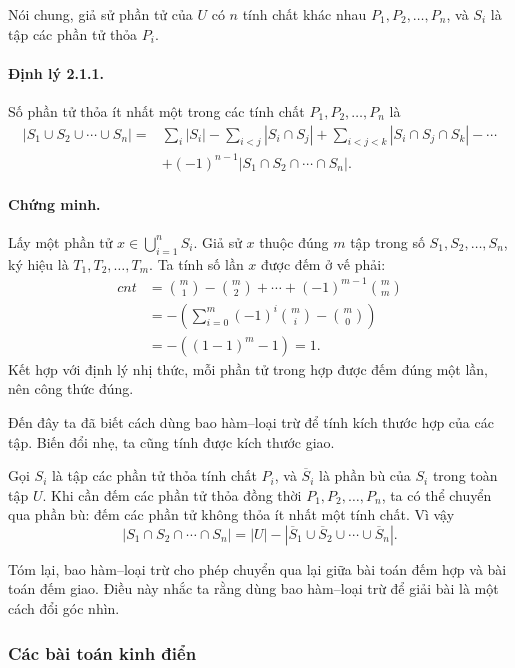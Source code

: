 \documentclass[11pt]{article}
\begin{document}
Nói chung, giả sử phần tử của \(U\) có \(n\) tính chất khác nhau
\(P_1,P_2,\ldots,P_n\), và \(S_i\) là tập các phần tử thỏa \(P_i\).

\paragraph{Định lý 2.1.1.}
Số phần tử thỏa ít nhất một trong các tính chất \(P_1,P_2,\ldots,P_n\) là
\[
\begin{aligned}
|S_1\cup S_2\cup\cdots\cup S_n|
={}&\sum_i |S_i|-\sum_{i<j}|S_i\cap S_j|
  +\sum_{i<j<k}|S_i\cap S_j\cap S_k|-\cdots\\
&+(-1)^{n-1}|S_1\cap S_2\cap\cdots\cap S_n|.
\end{aligned}
\]

\paragraph{Chứng minh.}
Lấy một phần tử \(x\in\bigcup_{i=1}^n S_i\). Giả sử \(x\) thuộc đúng
\(m\) tập trong số \(S_1,S_2,\ldots,S_n\), ký hiệu là
\(T_1,T_2,\ldots,T_m\). Ta tính số lần \(x\) được đếm ở vế phải:
\[
\begin{aligned}
\mathit{cnt}
&=\binom m1-\binom m2+\cdots+(-1)^{m-1}\binom mm\\
&=-\left(\sum_{i=0}^m(-1)^i\binom mi-\binom m0\right)\\
&=-((1-1)^m-1)=1.
\end{aligned}
\]
Kết hợp với định lý nhị thức, mỗi phần tử trong hợp được đếm đúng một lần, nên
công thức đúng.

Đến đây ta đã biết cách dùng bao hàm--loại trừ để tính kích thước hợp của các
tập. Biến đổi nhẹ, ta cũng tính được kích thước giao.

Gọi \(S_i\) là tập các phần tử thỏa tính chất \(P_i\), và \(\overline S_i\)
là phần bù của \(S_i\) trong toàn tập \(U\). Khi cần đếm các phần tử thỏa đồng
thời \(P_1,P_2,\ldots,P_n\), ta có thể chuyển qua phần bù: đếm các phần tử
không thỏa ít nhất một tính chất. Vì vậy
\[
  |S_1\cap S_2\cap\cdots\cap S_n|
  = |U|-|\overline S_1\cup\overline S_2\cup\cdots\cup\overline S_n|.
\]

Tóm lại, bao hàm--loại trừ cho phép chuyển qua lại giữa bài toán đếm hợp và
bài toán đếm giao. Điều này nhắc ta rằng dùng bao hàm--loại trừ để giải bài là
một cách đổi góc nhìn.

\subsubsection{Các bài toán kinh điển}
\end{document}
